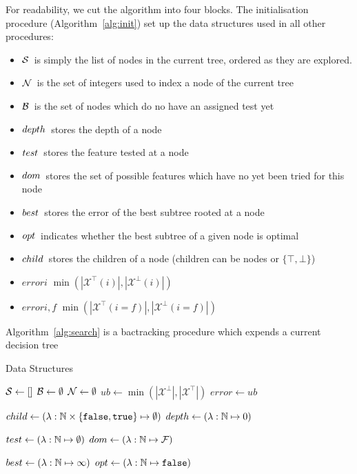 \documentclass{article}
\newcommand{\tru}[0]{\texttt{true}}
\newcommand{\fal}[0]{\texttt{false}}
\newcommand{\setex}[1]{\ensuremath{{\mathcal X}^{#1}}\xspace}
\newcommand{\posex}{{\setex{\top}}\xspace}
\newcommand{\negex}{{\setex{\bot}}\xspace}
\newcommand{\features}{\ensuremath{{\mathcal F}}\xspace}
\newcommand{\nodes}[0]{\ensuremath{{\cal N}}}
\newcommand{\blossom}[0]{\ensuremath{{\cal B}}}
\newcommand{\sequence}[0]{\ensuremath{{\cal S}}}
\newcommand{\anode}[0]{\ensuremath{i}}
\newcommand{\afeat}[0]{\ensuremath{f}}
\newcommand{\ub}[0]{\ensuremath{ub}}
\newcommand{\error}[0]{\ensuremath{error}}
\newcommand{\depth}[1][]{\ensuremath{\ifthenelse{\equal{#1}{}}{depth}{depth({#1})}}}
\newcommand{\test}[1][]{\ensuremath{\ifthenelse{\equal{#1}{}}{test}{test({#1})}}}
\newcommand{\dom}[1][]{\ensuremath{\ifthenelse{\equal{#1}{}}{dom}{dom({#1})}}}
\newcommand{\best}[1][]{\ensuremath{\ifthenelse{\equal{#1}{}}{{best}}{{best({#1})}}}}
\newcommand{\opt}[1][]{\ensuremath{\ifthenelse{\equal{#1}{}}{opt}{opt({#1})}}}
\newcommand{\child}[1][]{\ensuremath{\ifthenelse{\equal{#1}{}}{{child}}{{child({{#1}})}}}}
\begin{document}
For readability, we cut the algorithm into four blocks. The initialisation procedure (Algorithm~\ref{alg:init}) set up the data structures used in all other procedures:
\begin{itemize}
	\item \sequence\ is simply the list of nodes in the current tree, ordered as they are explored.
	\item \nodes\ is the set of integers used to index a node of the current tree
	\item \blossom\ is the set of nodes which do no have an assigned test yet
	\item \depth\ stores the depth of a node
	\item \test\ stores the feature tested at a node
	\item \dom\ stores the set of possible features which have no yet been tried for this node 
	\item \best\ stores the error of the best subtree rooted at a node 
	\item \opt\ indicates whether the best subtree of a given node is optimal
	\item \child\ stores the children of a node (children can be nodes or $\{\top, \bot\}$)
	\item $\error{\anode}$ $\min(|\posex(\anode)|,|\negex(\anode)|)$
	\item $\error{\anode,\afeat}$ $\min(|\posex(\anode=\afeat)|,|\negex(\anode=\afeat)|)$
\end{itemize}

Algorithm~\ref{alg:search} is a bactracking procedure which expends a current decision tree
	
	\begin{algorithm}
		\caption{Data Structures\label{alg:init}}
		$\sequence \gets []$\;
		$\blossom \gets \emptyset$\;
		$\nodes \gets \emptyset$\;
		$\ub \gets \min(|\negex|,|\posex|)$\;
		$\error \gets ub$\;
		
		$\child \gets (\lambda : \mathbb{N} \times \{\fal, \tru\} \mapsto \emptyset)$\;
		$\depth \gets (\lambda : \mathbb{N} \mapsto 0)$\;
		
		$\test \gets (\lambda : \mathbb{N} \mapsto \emptyset)$\;
		$\dom \gets (\lambda : \mathbb{N} \mapsto \features)$\;
		
		$\best \gets (\lambda : \mathbb{N} \mapsto \infty)$\;
		$\opt \gets (\lambda : \mathbb{N} \mapsto \fal)$\;
	\end{algorithm}
	
	
	
\end{document}
